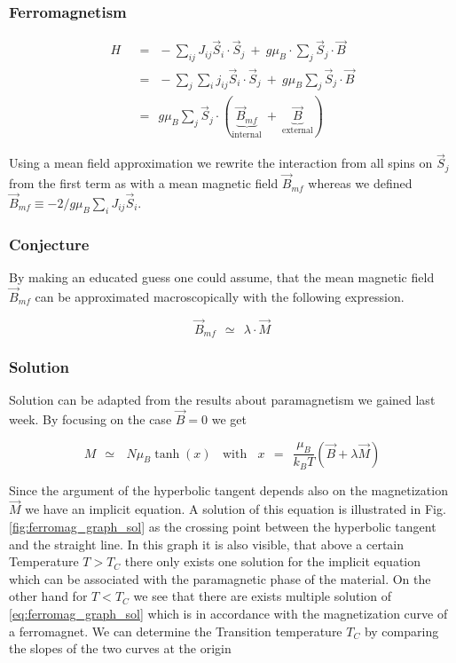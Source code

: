 \documentclass[10pt]{report}
\numberwithin{equation}{chapter}
\newcommand{\myRef}[1]{
  Fig.\ref{#1}
}
\begin{document}
\subsubsection{Ferromagnetism}

\begin{align}
  H ~~& =~~ - \sum_{ij} J_{ij} \vec{S}_i \cdot \vec{S}_j ~+~ g \mu_B \cdot \sum_j \vec{S}_j \cdot \vec{B}\nonumber \\  
      & =~~ - \sum_j \sum_i j_{ij} \vec{S}_i \cdot \vec{S}_j ~+~ g \mu_B \sum_j \vec{S}_j \cdot \vec{B}\nonumber \\
      & =~~ g \mu_B \sum_j \vec{S}_j \cdot ( \underbrace{\vec{B}_{mf}}_\text{internal} ~+~ \underbrace{\vec{B}}_\text{external})
\end{align}

Using a mean field approximation we rewrite the interaction from all spins on $\vec{S}_j$ from the first term as with a mean magnetic field $\vec{B}_{mf}$ whereas we defined $\vec{B}_{mf} \equiv -2/g \mu_B \sum_i J_{ij} \vec{S}_i$. 

\subsubsection{Conjecture}

By making an educated guess one could assume, that the mean magnetic field $\vec{B}_{mf}$ can be approximated macroscopically with the following expression.

\begin{equation}
  \vec{B}_{mf} ~~≃~~ \lambda \cdot \vec{M}
\end{equation}


\subsubsection{Solution}

Solution can be adapted from the results about paramagnetism we gained last week. By focusing on the case $\vec{B} = 0$ we get

\begin{equation} \label{eq:ferromag_graph_sol}
  M ~~≃~~~ N \mu_B \tanh(x) ~~~~ \text{with} ~~~~ x ~~=~~\frac{\mu_B}{k_BT} (\vec{B} + \lambda \vec{M})
\end{equation}

Since the argument of the hyperbolic tangent depends also on the magnetization $\vec{M}$ we have an implicit equation. A solution of this equation is illustrated in \myRef{fig:ferromag_graph_sol} as the crossing point between the hyperbolic tangent and the straight line. In this graph it is also visible, that above a certain Temperature $T>T_C$ there only exists one solution for the implicit equation which can be associated with the paramagnetic phase of the material. On the other hand for $T<T_C$ we see that there are exists multiple solution of \ref{eq:ferromag_graph_sol} which is in accordance with the magnetization curve of a ferromagnet. We can determine the Transition temperature $T_C$ by comparing the slopes of the two curves at the origin
\end{document}
